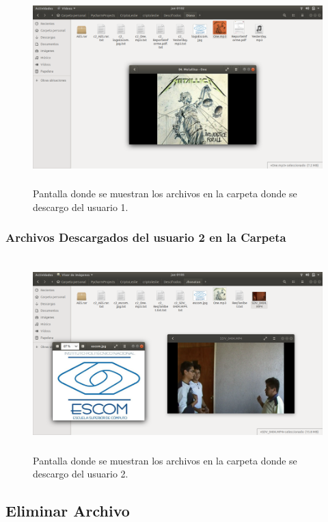			\begin{figure}[H]
			\centering
			\includegraphics[width=14cm, height=7.5cm]{./images/Implementacion/DescargarArchivoCarpeta2.png}
			\caption{Pantalla donde se muestran los archivos en la carpeta donde se descargo del usuario 1.}
			\label{fig:6-1-34} 
			\end{figure}

\subsubsection{Archivos Descargados del usuario 2 en la Carpeta}

			\begin{figure}[H]
			\centering
			\includegraphics[width=14cm, height=7.5cm]{./images/Implementacion/DescargarArchivoCarpeta3.png}
			\caption{Pantalla donde se muestran los archivos en la carpeta donde se descargo del usuario 2.}
			\label{fig:6-1-35} 
			\end{figure}

\subsection{Eliminar Archivo}

